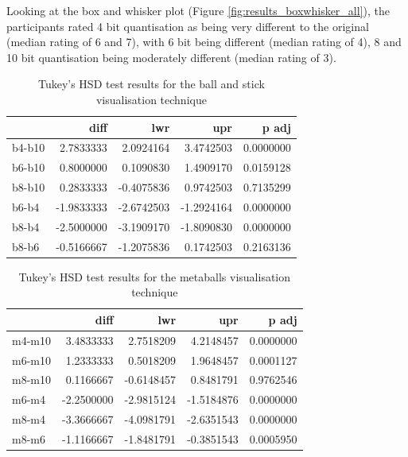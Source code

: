 Looking at the box and whisker plot (Figure
\ref{fig:results_boxwhisker_all}), the participants rated 4 bit quantisation
as being very different to the original (median rating of 6 and 7), with 6 bit
being different (median rating of 4), 8 and 10 bit quantisation being
moderately different (median rating of 3).

\begin{table}[h!]
  \begin{tabular}{ | l | r | r | r | r |}
  \hline
         &       diff &        lwr &        upr &     p adj  \\ \hline
  b4-b10 &  2.7833333 &  2.0924164 &  3.4742503 & 0.0000000  \\ \hline
  b6-b10 &  0.8000000 &  0.1090830 &  1.4909170 & 0.0159128  \\ \hline
  b8-b10 &  0.2833333 & -0.4075836 &  0.9742503 & 0.7135299  \\ \hline
  b6-b4  & -1.9833333 & -2.6742503 & -1.2924164 & 0.0000000  \\ \hline
  b8-b4  & -2.5000000 & -3.1909170 & -1.8090830 & 0.0000000  \\ \hline
  b8-b6  & -0.5166667 & -1.2075836 &  0.1742503 & 0.2163136  \\ \hline
  \end{tabular}
  \caption{Tukey's HSD test results for the ball and stick visualisation
  technique}
  \label{tab:results_ballstick_tukeyhsd}
\end{table}

\begin{table}[h!]
  \begin{tabular}{ | l | r | r | r | r |}
  \hline
         &       diff &        lwr &        upr &     p adj  \\ \hline
  m4-m10 &  3.4833333 &  2.7518209 &  4.2148457 & 0.0000000  \\ \hline
  m6-m10 &  1.2333333 &  0.5018209 &  1.9648457 & 0.0001127  \\ \hline
  m8-m10 &  0.1166667 & -0.6148457 &  0.8481791 & 0.9762546  \\ \hline
  m6-m4  & -2.2500000 & -2.9815124 & -1.5184876 & 0.0000000  \\ \hline
  m8-m4  & -3.3666667 & -4.0981791 & -2.6351543 & 0.0000000  \\ \hline
  m8-m6  & -1.1166667 & -1.8481791 & -0.3851543 & 0.0005950  \\ \hline
  \end{tabular}
  \caption{Tukey's HSD test results for the metaballs visualisation technique}
  \label{tab:results_metaballs_tukeyhsd}
\end{table}

